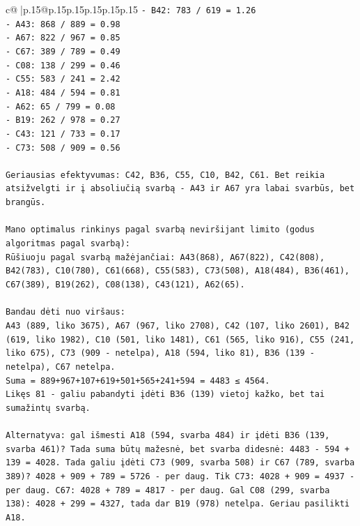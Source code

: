 \documentclass{article}
\begin{document}
{\begin{supertabular}{c@{$\;$}|p{.15\linewidth}@{}p{.15\linewidth}p{.15\linewidth}p{.15\linewidth}p{.15\linewidth}p{.15\linewidth}}
{{{\texttt{{-} B42: 783 / 619 = 1.26} \\
\texttt{{-} A43: 868 / 889 = 0.98} \\
\texttt{{-} A67: 822 / 967 = 0.85} \\
\texttt{{-} C67: 389 / 789 = 0.49} \\
\texttt{{-} C08: 138 / 299 = 0.46} \\
\texttt{{-} C55: 583 / 241 = 2.42} \\
\texttt{{-} A18: 484 / 594 = 0.81} \\
\texttt{{-} A62: 65 / 799 = 0.08} \\
\texttt{{-} B19: 262 / 978 = 0.27} \\
\texttt{{-} C43: 121 / 733 = 0.17} \\
\texttt{{-} C73: 508 / 909 = 0.56} \\
\\ 
\texttt{Geriausias efektyvumas: C42, B36, C55, C10, B42, C61. Bet reikia atsižvelgti ir į absoliučią svarbą {-} A43 ir A67 yra labai svarbūs, bet brangūs.} \\
\\ 
\texttt{Mano optimalus rinkinys pagal svarbą neviršijant limito (godus algoritmas pagal svarbą):} \\
\texttt{Rūšiuoju pagal svarbą mažėjančiai: A43(868), A67(822), C42(808), B42(783), C10(780), C61(668), C55(583), C73(508), A18(484), B36(461), C67(389), B19(262), C08(138), C43(121), A62(65).} \\
\\ 
\texttt{Bandau dėti nuo viršaus:} \\
\texttt{A43 (889, liko 3675), A67 (967, liko 2708), C42 (107, liko 2601), B42 (619, liko 1982), C10 (501, liko 1481), C61 (565, liko 916), C55 (241, liko 675), C73 (909 {-} netelpa), A18 (594, liko 81), B36 (139 {-} netelpa), C67 netelpa.} \\
\texttt{Suma = 889+967+107+619+501+565+241+594 = 4483 ≤ 4564. } \\
\texttt{Likęs 81 {-} galiu pabandyti įdėti B36 (139) vietoj kažko, bet tai sumažintų svarbą.} \\
\\ 
\texttt{Alternatyva: gal išmesti A18 (594, svarba 484) ir įdėti B36 (139, svarba 461)? Tada suma būtų mažesnė, bet svarba didesnė: 4483 {-} 594 + 139 = 4028. Tada galiu įdėti C73 (909, svarba 508) ir C67 (789, svarba 389)? 4028 + 909 + 789 = 5726 {-} per daug. Tik C73: 4028 + 909 = 4937 {-} per daug. C67: 4028 + 789 = 4817 {-} per daug. Gal C08 (299, svarba 138): 4028 + 299 = 4327, tada dar B19 (978) netelpa. Geriau pasilikti A18.} \\
}}}
\end{supertabular}}
\end{document}
